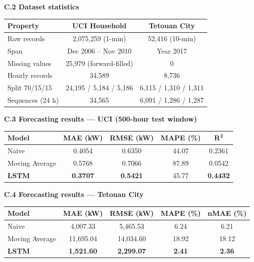 \documentclass[11pt,a4paper]{article}
\begin{document}
\noindent\textbf{C.2 Dataset statistics}\par\smallskip
\begin{tabular}{|l|c|c|}
\hline
\textbf{Property} & \textbf{UCI Household} & \textbf{Tetouan City}\\ \hline
Raw records & 2{,}075{,}259 (1-min) & 52{,}416 (10-min)\\ \hline
Span & Dec 2006 -- Nov 2010 & Year 2017\\ \hline
Missing values & 25{,}979 (forward-filled) & 0\\ \hline
Hourly records & 34{,}589 & 8{,}736\\ \hline
Split 70/15/15 & 24{,}195 / 5{,}184 / 5{,}186 & 6{,}115 / 1{,}310 / 1{,}311\\ \hline
Sequences (24 h) & 34{,}565 & 6{,}091 / 1{,}286 / 1{,}287\\ \hline
\end{tabular}
\bigskip

\noindent\textbf{C.3 Forecasting results --- UCI (500-hour test window)}\par\smallskip
\begin{tabular}{|l|c|c|c|c|}
\hline
\textbf{Model} & \textbf{MAE (kW)} & \textbf{RMSE (kW)} & \textbf{MAPE (\%)} & $\mathbf{R^2}$\\ \hline
Naive & 0.4054 & 0.6350 & 44.07 & 0.2361\\ \hline
Moving Average & 0.5768 & 0.7066 & 87.89 & 0.0542\\ \hline
\textbf{LSTM} & \textbf{0.3707} & \textbf{0.5421} & 45.77 & \textbf{0.4432}\\ \hline
\end{tabular}
\bigskip

\noindent\textbf{C.4 Forecasting results --- Tetouan City}\par\smallskip
\begin{tabular}{|l|c|c|c|c|}
\hline
\textbf{Model} & \textbf{MAE (kW)} & \textbf{RMSE (kW)} & \textbf{MAPE (\%)} & \textbf{nMAE (\%)}\\ \hline
Naive & 4{,}007.33 & 5{,}465.53 & 6.24 & 6.21\\ \hline
Moving Average & 11{,}695.04 & 14{,}034.60 & 18.92 & 18.12\\ \hline
\textbf{LSTM} & \textbf{1{,}521.60} & \textbf{2{,}299.07} & \textbf{2.41} & \textbf{2.36}\\ \hline
\end{tabular}
\bigskip
\end{document}
